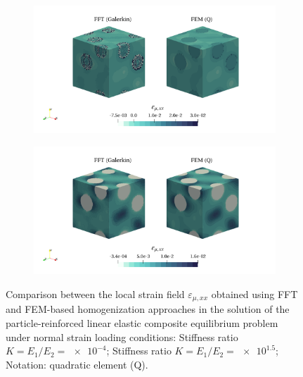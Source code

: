 \begin{figure}[hbt]
  \centering
	\begin{subfigure}[b]{\textwidth}
    \centering
    \includegraphics[width=\textwidth]{figures/linear_3D_ratio_-4_normal_strain_11}
    \caption{}
    \label{subfig:linear_3D_ratio_-4_normal_strain_11}
  \end{subfigure}
  \begin{subfigure}[b]{\textwidth}
    \centering
    \includegraphics[width=\textwidth]{figures/linear_3D_ratio_1_5_normal_strain_11}
    \caption{}
    \label{subfig:linear_3D_ratio_1_5_normal_strain_11}
  \end{subfigure}
  \caption{Comparison between the local strain field \(\varepsilon_{\mu,xx}\) obtained using
  FFT and FEM-based homogenization approaches in the solution of the particle-reinforced
  linear elastic composite equilibrium problem under normal strain loading conditions:
   Stiffness ratio \(K=E_1/E_2=\num{e-4}\);
   Stiffness ratio \(K=E_1/E_2=\num{e1.5}\);
  Notation: quadratic element (Q).}
\label{fig:linear_3D_stiff_contrast_normal_strain_11}
\end{figure}

